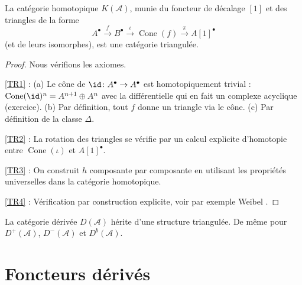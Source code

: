 \begin{theoreme}\label{thm:K-triangulated}
La catégorie homotopique $K(\mathcal{A})$, munie du foncteur de décalage
$[1]$ et des triangles de la forme
\[
  A^\bullet \xrightarrow{f} B^\bullet \xrightarrow{\iota}
  \operatorname{Cone}(f) \xrightarrow{\pi} A[1]^\bullet
\]
(et de leurs isomorphes), est une catégorie triangulée.
\end{theoreme}

\begin{proof}
Nous vérifions les axiomes.

\ref{TR1} : (a) Le cône de $\id \colon A^\bullet \to A^\bullet$ est
homotopiquement trivial : $\operatorname{Cone}(\id)^n = A^{n+1} \oplus A^n$
avec la différentielle qui en fait un complexe acyclique (exercice).
(b) Par définition, tout $f$ donne un triangle via le cône.
(c) Par définition de la classe $\Delta$.

\ref{TR2} : La rotation des triangles se vérifie par un calcul explicite
d'homotopie entre $\operatorname{Cone}(\iota)$ et $A[1]^\bullet$.

\ref{TR3} : On construit $h$ composante par composante en utilisant les
propriétés universelles dans la catégorie homotopique.

\ref{TR4} : Vérification par construction explicite, voir par exemple
Weibel \cite[1.5]{weibel1994}.
\end{proof}

\begin{corollaire}\label{cor:D-triangulated}
La catégorie dérivée $D(\mathcal{A})$ hérite d'une structure triangulée.
De même pour $D^+(\mathcal{A})$, $D^-(\mathcal{A})$ et $D^b(\mathcal{A})$.
\end{corollaire}


\section{Foncteurs dérivés}\label{sec:derived-functors}

